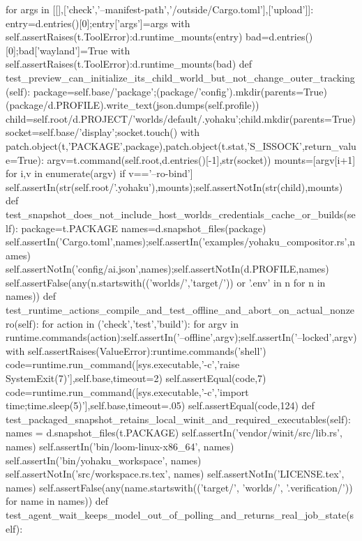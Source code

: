         for args in [[],['check','--manifest-path','/outside/Cargo.toml'],['upload']]:
            entry=d.entries()[0];entry['args']=args
            with self.assertRaises(t.ToolError):d.runtime_mounts(entry)
        bad=d.entries()[0];bad['wayland']=True
        with self.assertRaises(t.ToolError):d.runtime_mounts(bad)
    def test_preview_can_initialize_its_child_world_but_not_change_outer_tracking(self):
        package=self.base/'package';(package/'config').mkdir(parents=True)
        (package/d.PROFILE).write_text(json.dumps(self.profile))
        child=self.root/d.PROJECT/'worlds/default/.yohaku';child.mkdir(parents=True)
        socket=self.base/'display';socket.touch()
        with patch.object(t,'PACKAGE',package),patch.object(t.stat,'S_ISSOCK',return_value=True):
            argv=t.command(self.root,d.entries()[-1],str(socket))
        mounts=[argv[i+1] for i,v in enumerate(argv) if v=='--ro-bind']
        self.assertIn(str(self.root/'.yohaku'),mounts);self.assertNotIn(str(child),mounts)
    def test_snapshot_does_not_include_host_worlds_credentials_cache_or_builds(self):
        package=t.PACKAGE
        names=d.snapshot_files(package)
        self.assertIn('Cargo.toml',names);self.assertIn('examples/yohaku_compositor.rs',names)
        self.assertNotIn('config/ai.json',names);self.assertNotIn(d.PROFILE,names)
        self.assertFalse(any(n.startswith(('worlds/','target/')) or '.env' in n for n in names))
    def test_runtime_actions_compile_and_test_offline_and_abort_on_actual_nonzero(self):
        for action in ('check','test','build'):
            for argv in runtime.commands(action):self.assertIn('--offline',argv);self.assertIn('--locked',argv)
        with self.assertRaises(ValueError):runtime.commands('shell')
        code=runtime.run_command([sys.executable,'-c','raise SystemExit(7)'],self.base,timeout=2)
        self.assertEqual(code,7)
        code=runtime.run_command([sys.executable,'-c','import time;time.sleep(5)'],self.base,timeout=.05)
        self.assertEqual(code,124)
    def test_packaged_snapshot_retains_local_winit_and_required_executables(self):
        names = d.snapshot_files(t.PACKAGE)
        self.assertIn('vendor/winit/src/lib.rs', names)
        self.assertIn('bin/loom-linux-x86_64', names)
        self.assertIn('bin/yohaku_workspace', names)
        self.assertNotIn('src/workspace.rs.tex', names)
        self.assertNotIn('LICENSE.tex', names)
        self.assertFalse(any(name.startswith(('target/', 'worlds/', '.verification/')) for name in names))
    def test_agent_wait_keeps_model_out_of_polling_and_returns_real_job_state(self):
